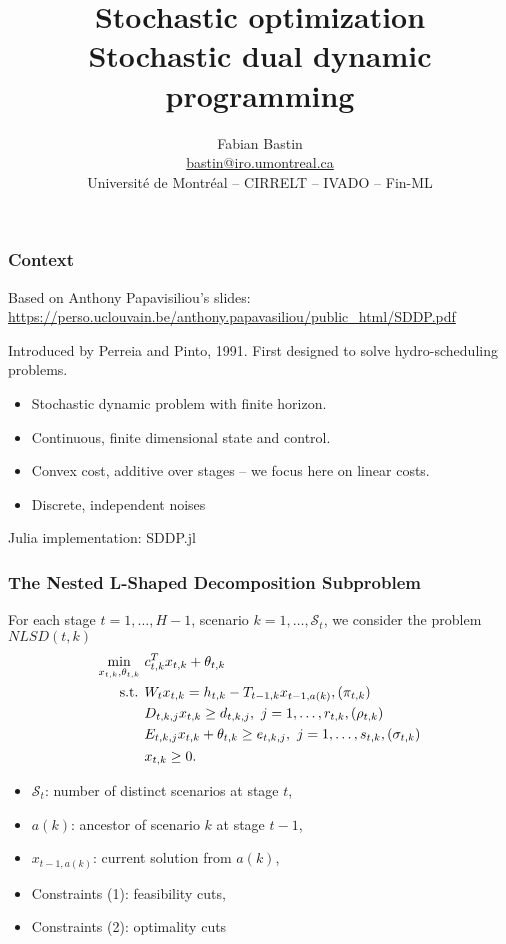 \documentclass{beamer}
\title[SA vs SAA]{Stochastic optimization\\Stochastic dual dynamic programming}
\author[Fabian Bastin]{Fabian Bastin \\ \url{bastin@iro.umontreal.ca} \\ Université de Montréal -- CIRRELT -- IVADO -- Fin-ML}
\date{}
\def\KK{\mathcal{K}}
\def\KK{\mathcal{S}}
\begin{document}
\frame{\titlepage}

\begin{frame}
\frametitle{Context}

Based on Anthony Papavisiliou's slides:
\url{https://perso.uclouvain.be/anthony.papavasiliou/public_html/SDDP.pdf}

\mbox{}

Introduced by Perreia and Pinto, 1991.
First designed to solve hydro-scheduling problems.

\mbox{}

\begin{itemize}
\item
Stochastic dynamic problem with finite horizon.
\item
Continuous, finite dimensional state and control.
\item
Convex cost, additive over stages -- we focus here on linear costs.
\item
Discrete, independent noises
\end{itemize}

\mbox{}

Julia implementation: SDDP.jl

\end{frame}

\begin{frame}
\frametitle{The Nested L-Shaped Decomposition Subproblem}

For each stage $t = 1,\ldots, H-1$, scenario $k = 1,\ldots,\KK_t$, we consider the problem $NLSD(t,k)$
\begin{align}
\min_{x_{t,k}, \theta_{t,k}}\ & c_{t,k}^T x_{t,k} + \theta_{t,k} \notag \\
\mbox{s.t. } &
W_t x_{t,k} = h_{t,k} - T_{t-1,k} x_{t-1,a(k)}, (\pi_{t,k})  \notag \\
& D_{t,k,j}x_{t,k} \geq d_{t,k,j},\ j = 1,\ldots,r_{t,k}, (\rho_{t,k}) \\
& E_{t,k,j}x_{t,k} + \theta_{t,k} \geq e_{t,k,j},\ j = 1,\ldots, s_{t,k}, (\sigma_{t,k}) \\
&
\begin{aligned}
 x_{t,k} \geq 0.  \notag
\end{aligned}
\end{align}
\begin{itemize}
\item
$\KK_t$: number of distinct scenarios at stage $t$,
\item
$a(k)$: ancestor of scenario $k$ at stage $t - 1$,
\item
$x_{t-1,a(k)}$: current solution from $a(k)$,
\item
Constraints (1): feasibility cuts,
\item
Constraints (2): optimality cuts
\end{itemize}

\end{frame}
\end{document}
